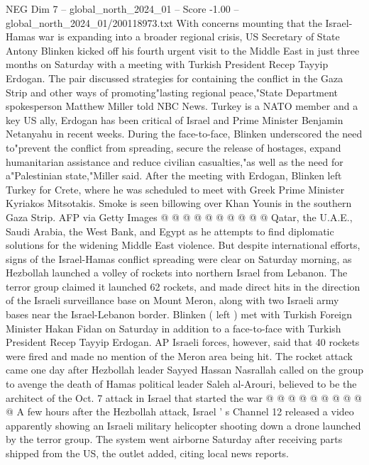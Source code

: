 \begin{textsample}{NEG Dim 7 – global\_north\_2024\_01 – Score -1.00 – global\_north\_2024\_01/200118973.txt}  \label{ex:f7_neg_262}
With concerns mounting that the Israel-Hamas war is expanding into a broader regional crisis, US Secretary of State Antony Blinken kicked off his fourth urgent visit to the Middle East in just three months on Saturday with a meeting with Turkish President Recep Tayyip Erdogan.
The pair discussed strategies for containing the conflict in the Gaza Strip and other ways of promoting"lasting regional peace,"State Department spokesperson Matthew Miller told NBC News.
Turkey is a NATO member and a key US ally, Erdogan has been critical of Israel and Prime Minister Benjamin Netanyahu in recent weeks.
During the face-to-face, Blinken underscored the need to"prevent the conflict from spreading, secure the release of hostages, expand humanitarian assistance and reduce civilian casualties,"as well as the need for a"Palestinian state,"Miller said.
After the meeting with Erdogan, Blinken left Turkey for Crete, where he was scheduled to meet with Greek Prime Minister Kyriakos Mitsotakis.
Smoke is seen billowing over Khan Younis in the southern Gaza Strip.
AFP via Getty Images @ @ @ @ @ @ @ @ @ @ Qatar, the U.A.E., Saudi Arabia, the West Bank, and Egypt as he attempts to find diplomatic solutions for the widening Middle East violence.
But despite international efforts, signs of the Israel-Hamas conflict spreading were clear on Saturday morning, as Hezbollah launched a volley of rockets into northern Israel from Lebanon.
The terror group claimed it launched 62 rockets, and made direct hits in the direction of the Israeli surveillance base on Mount Meron, along with two Israeli army bases near the Israel-Lebanon border.
Blinken ( left ) met with Turkish Foreign Minister Hakan Fidan on Saturday in addition to a face-to-face with Turkish President Recep Tayyip Erdogan.
AP Israeli forces, however, said that 40 rockets were fired and made no mention of the Meron area being hit.
The rocket attack came one day after Hezbollah leader Sayyed Hassan Nasrallah called on the group to avenge the death of Hamas political leader Saleh al-Arouri, believed to be the architect of the Oct. 7 attack in Israel that started the war @ @ @ @ @ @ @ @ @ @ A few hours after the Hezbollah attack, Israel ' s Channel 12 released a video apparently showing an Israeli military helicopter shooting down a drone launched by the terror group.
The system went airborne Saturday after receiving parts shipped from the US, the outlet added, citing local news reports.

\end{textsample}
